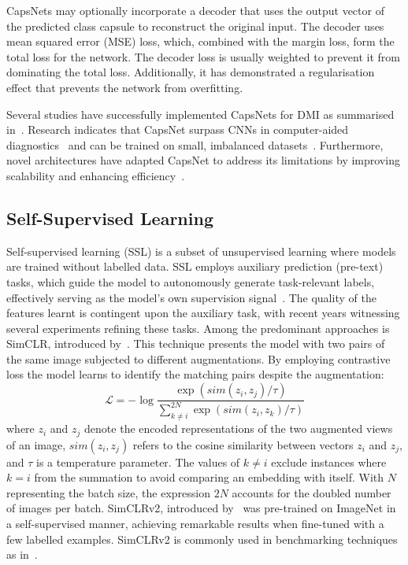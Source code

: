 CapsNets may optionally incorporate a decoder that uses the output vector of the predicted class capsule to reconstruct the original input. The decoder uses mean squared error (MSE) loss, which, combined with the margin loss, form the total loss for the network. The decoder loss is usually weighted to prevent it from dominating the total loss. Additionally, it has demonstrated a regularisation effect that prevents the network from overfitting.

Several studies have successfully implemented CapsNets for DMI as summarised in~\cite{ElShimy2022ARO}. Research indicates that CapsNet surpass CNNs in computer-aided diagnostics~\cite{deepika-2022} and can be trained on small, imbalanced datasets~\cite{Afshar20203DMCNA3}. Furthermore, novel architectures have adapted CapsNet to address its limitations by improving scalability and enhancing efficiency~\cite{deepika-2022}.


\subsection{Self-Supervised Learning}
Self-supervised learning (SSL) is a subset of unsupervised learning where models are trained without labelled data. SSL employs auxiliary prediction (pre-text) tasks, which guide the model to autonomously generate task-relevant labels, effectively serving as the model's own supervision signal~\cite{krenzer-2023}. The quality of the features learnt is contingent upon the auxiliary task, with recent years witnessing several experiments refining these tasks. Among the predominant approaches is SimCLR, introduced by~\cite{chen-2020}. This technique presents the model with two pairs of the same image subjected to different augmentations. By employing contrastive loss the model learns to identify the matching pairs despite the augmentation:
\begin{equation}
\mathcal{L} = -\log \frac{\exp(sim(z_i, z_j)/\tau)}{\sum_{k \neq i}^{2N} \exp(sim(z_i, z_k)/\tau)}
\end{equation}
where $z_i$ and $z_j$ denote the encoded representations of the two augmented views of an image, $sim(z_i,z_j)$ refers to the cosine similarity between vectors $z_i$ and $z_j$, and $\tau$ is a temperature parameter. The values of $k \neq i$ exclude instances where $k=i$ from the summation to avoid comparing an embedding with itself. With $N$ representing the batch size, the expression $2N$ accounts for the doubled number of images per batch. SimCLRv2, introduced by~\cite{Chen2020BigSM} was pre-trained on ImageNet in a self-supervised manner, achieving remarkable results when fine-tuned with a few labelled examples. SimCLRv2 is commonly used in benchmarking techniques as in~\cite{caron-2021}.

